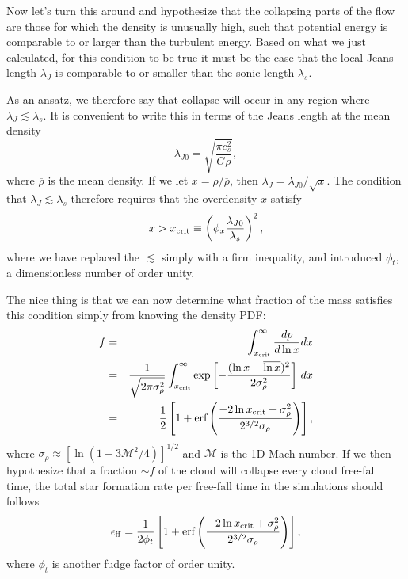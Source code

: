 Now let's turn this around and hypothesize that the collapsing parts of the flow are those for which the density is unusually high, such that potential energy is comparable to or larger than the turbulent energy. Based on what we just calculated, for this condition to be true it must be the case that the local Jeans length $\lambda_J$ is comparable to or smaller than the sonic length $\lambda_s$.

As an ansatz, we therefore say that collapse will occur in any region where $\lambda_J \lesssim \lambda_s$. It is convenient to write this in terms of the Jeans length at the mean density
\begin{equation}
\lambda_{J0}=\sqrt{\frac{\pi c_s^2}{G\overline{\rho}}},
\end{equation}
where $\overline{\rho}$ is the mean density.
If we let $x = \rho/\overline{\rho}$, then $\lambda_J = \lambda_{J0}/\sqrt{x}$. The condition that $\lambda_J \lesssim \lambda_s$ therefore requires that the overdensity $x$ satisfy
\begin{equation}
x > x_{\rm crit} \equiv \left(\phi_x \frac{\lambda_{J0}}{\lambda_s}\right)^2,
\end{equation}
where we have replaced the $\lesssim$ simply with a firm inequality, and introduced $\phi_t$, a dimensionless number of order unity.

The nice thing is that we can now determine what fraction of the mass satisfies this condition simply from knowing the density PDF:
\begin{eqnarray}
f & = & \int_{x_{\rm crit}}^\infty \frac{dp}{d\ln x} dx \\
& = & \frac{1}{\sqrt{2\pi \sigma_{\rho}^2}}
\int_{x_{\rm crit}}^\infty \exp\left[-\frac{(\ln x - \overline{\ln x})^2}{2\sigma_{\rho}^2}\right] \, dx \\
& = & \frac{1}{2} \left[1+\mbox{erf}\left(\frac{-2\ln x_{\rm crit}+\sigma_{\rho}^2}{2^{3/2}\sigma_{\rho}}\right)\right],
\end{eqnarray}
where $\sigma_{\rho} \approx [\ln(1+3\mathcal{M}^2/4)]^{1/2}$ and $\mathcal{M}$ is the 1D Mach number.
If we then hypothesize that a fraction $\sim f$ of the cloud will collapse every cloud free-fall time, the total star formation rate per free-fall time in the simulations should follows
\begin{equation}
\epsilon_{\rm ff} = \frac{1}{2 \phi_t} \left[1+\mbox{erf}\left(\frac{-2\ln x_{\rm crit}+\sigma_{\rho}^2}{2^{3/2}\sigma_{\rho}}\right)\right],
\end{equation}
where $\phi_t$ is another fudge factor of order unity.

